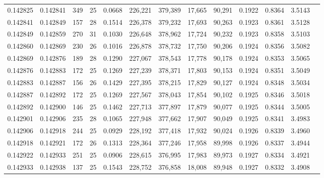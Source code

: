 \begin{tabular}{rrrrrrrrrrrrr}
0.142825 & 0.142841 & 349 &  25 &                                     0.0668 & 226,221 & 379,389 &  17,665 &  90,291 & 0.1922 & 0.8364 & 3.5143 \\
0.142841 & 0.142849 & 157 &  28 &                                     0.1514 & 226,378 & 379,232 &  17,693 &  90,263 & 0.1923 & 0.8361 & 3.5128 \\
0.142849 & 0.142859 & 270 &  31 &                                     0.1030 & 226,648 & 378,962 &  17,724 &  90,232 & 0.1923 & 0.8358 & 3.5103 \\
0.142860 & 0.142869 & 230 &  26 &                                     0.1016 & 226,878 & 378,732 &  17,750 &  90,206 & 0.1924 & 0.8356 & 3.5082 \\
0.142869 & 0.142876 & 189 &  28 &                                     0.1290 & 227,067 & 378,543 &  17,778 &  90,178 & 0.1924 & 0.8353 & 3.5065 \\
0.142876 & 0.142883 & 172 &  25 &                                     0.1269 & 227,239 & 378,371 &  17,803 &  90,153 & 0.1924 & 0.8351 & 3.5049 \\
0.142883 & 0.142887 & 156 &  26 &                                     0.1429 & 227,395 & 378,215 &  17,829 &  90,127 & 0.1924 & 0.8348 & 3.5034 \\
0.142887 & 0.142892 & 172 &  25 &                                     0.1269 & 227,567 & 378,043 &  17,854 &  90,102 & 0.1925 & 0.8346 & 3.5018 \\
0.142892 & 0.142900 & 146 &  25 &                                     0.1462 & 227,713 & 377,897 &  17,879 &  90,077 & 0.1925 & 0.8344 & 3.5005 \\
0.142901 & 0.142906 & 235 &  28 &                                     0.1065 & 227,948 & 377,662 &  17,907 &  90,049 & 0.1925 & 0.8341 & 3.4983 \\
0.142906 & 0.142918 & 244 &  25 &                                     0.0929 & 228,192 & 377,418 &  17,932 &  90,024 & 0.1926 & 0.8339 & 3.4960 \\
0.142918 & 0.142921 & 172 &  26 &                                     0.1313 & 228,364 & 377,246 &  17,958 &  89,998 & 0.1926 & 0.8337 & 3.4944 \\
0.142922 & 0.142933 & 251 &  25 &                                     0.0906 & 228,615 & 376,995 &  17,983 &  89,973 & 0.1927 & 0.8334 & 3.4921 \\
0.142933 & 0.142938 & 137 &  25 &                                     0.1543 & 228,752 & 376,858 &  18,008 &  89,948 & 0.1927 & 0.8332 & 3.4908 \\

\end{tabular}
